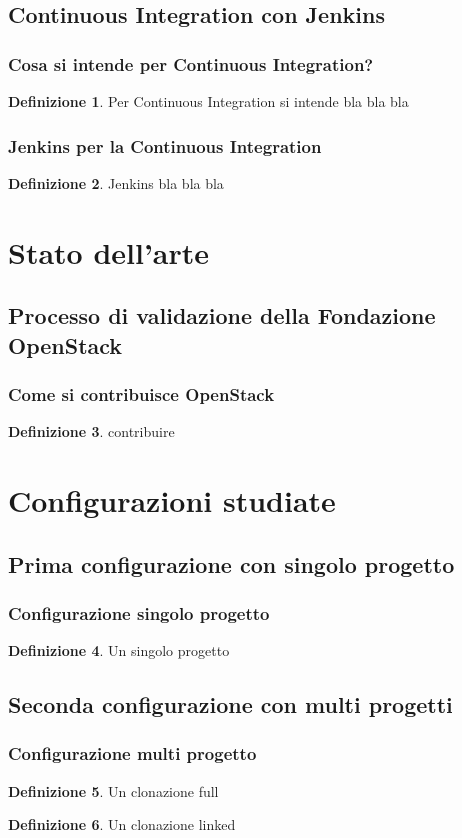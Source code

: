 \documentclass{beamer}
\theoremstyle{definition}
\newtheorem{definizione}{Definizione}
\theoremstyle{plain}
\begin{document}
\subsection{Continuous Integration con Jenkins}
\begin{frame}
\frametitle{Cosa si intende per Continuous Integration?}
\begin{definizione}
Per \alert{Continuous Integration} si intende  bla bla bla
\end{definizione}
\end{frame}


\begin{frame}
\frametitle{Jenkins per la Continuous Integration}
\begin{definizione}
\alert{Jenkins} bla bla bla
\end{definizione}
\end{frame}

\section{Stato dell'arte}
\subsection{Processo di validazione della Fondazione OpenStack}
\begin{frame}
\frametitle{Come si contribuisce OpenStack}
\begin{definizione}
 \alert{contribuire} 
\end{definizione}
\end{frame}

\section{Configurazioni studiate}
\subsection{Prima configurazione con singolo progetto}
\begin{frame}
\frametitle{Configurazione singolo progetto}
\begin{definizione}
Un \alert{singolo progetto}
\end{definizione}
\end{frame}

\subsection{Seconda configurazione con multi progetti}
\begin{frame}
\frametitle{Configurazione multi progetto}
\begin{definizione}
Un \alert{clonazione full} 
\end{definizione}
\begin{definizione}
Un \alert{clonazione linked} 
\end{definizione}
\end{frame}
\end{document}

